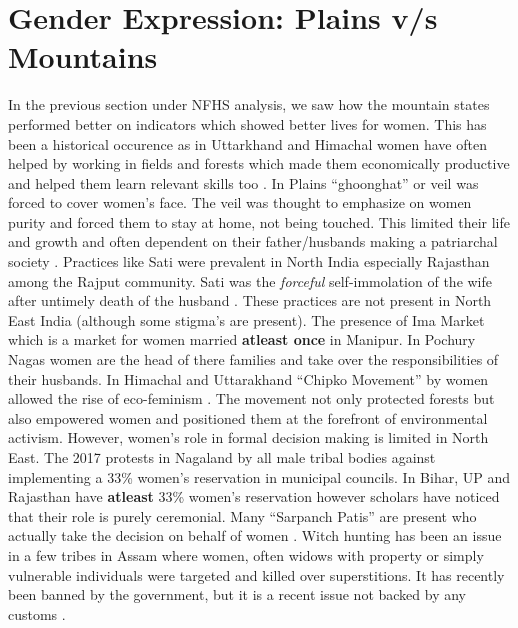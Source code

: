 \section{Gender Expression: Plains v/s Mountains}
In the previous section under NFHS analysis, we saw how the mountain states performed better on indicators which showed better lives for women. This has been a historical occurence as in Uttarkhand and Himachal women have often helped by  working in fields and forests which made them economically productive and helped them learn relevant skills too \citep{gooch2014daughters}. In Plains ``ghoonghat'' or veil was forced to cover women's face. The veil was thought to emphasize on women purity and forced them to stay at home, not being touched. This limited their life and growth and often dependent on their father/husbands making a patriarchal society \citep{chowdhry1993persistence}. Practices like Sati were prevalent in North India especially Rajasthan among the Rajput community. Sati was the \textit{forceful} self-immolation of the wife after  untimely death of the husband \citep{sangari1981sati}. These practices are not present in North East India (although some stigma's are present). The presence of Ima Market which is a market for  women married \textbf{atleast once} in Manipur. In Pochury Nagas women are the head of there families and take over the responsibilities of their husbands. In Himachal and Uttarakhand ``Chipko Movement'' by women allowed the rise of eco-feminism \citep{moore2011eco}. The movement not only protected forests but also empowered women and positioned them at the forefront of environmental activism.  However, women's role in formal decision making is limited in North East. The 2017 protests in Nagaland by all male tribal bodies against implementing a 33\% women's reservation in municipal councils.  In Bihar, UP and Rajasthan have \textbf{atleast} 33\% women's reservation however scholars have noticed that their role is purely ceremonial. Many ``Sarpanch Patis'' are present who actually take the decision on behalf of women \citep{rajasekhar2016women}. Witch hunting has been an issue in a few tribes in Assam where  women, often widows with property or simply vulnerable individuals were targeted and killed over superstitions. It has recently been banned by the government, but it is a recent issue not backed by any customs \citep{mishra2018targeting}.
